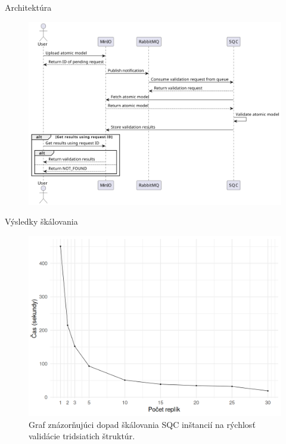 \documentclass[
  aspectratio=169,
]{beamer}
\begin{document}
\begin{frame}{Architektúra}
	\begin{figure}
		\includegraphics[width=.9\textwidth,height=.9\textheight,keepaspectratio]{img/sequence.png}
	\end{figure}
\end{frame}

\begin{frame}{Výsledky škálovania}
	\begin{figure}
		\includegraphics[width=.8\textwidth,height=.8\textheight,keepaspectratio]{img/replica-perf.png}
		\caption{Graf znázorňujúci dopad škálovania SQC inštancií na rýchlosť validácie tridsiatich štruktúr.}
	\end{figure}
\end{frame}
\end{document}

